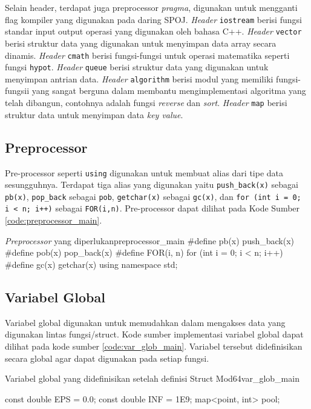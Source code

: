 Selain header, terdapat juga preprocessor \textit{pragma}, digunakan untuk mengganti flag kompiler yang digunakan pada daring SPOJ.
\textit{Header} \texttt{iostream} berisi fungsi standar input output operasi yang digunakan oleh bahasa C++. \textit{Header} \texttt{vector} berisi struktur data yang digunakan untuk menyimpan data array secara dinamis. \textit{Header} \texttt{cmath} berisi fungsi-fungsi untuk operasi matematika seperti fungsi \texttt{hypot}. \textit{Header} \texttt{queue} berisi struktur data yang digunakan untuk menyimpan antrian data. \textit{Header} \texttt{algorithm} berisi modul yang memiliki fungsi-fungsii yang sangat berguna dalam membantu mengimplementasi algoritma yang telah dibangun, contohnya adalah fungsi \textit{reverse} dan \textit{sort}. \textit{Header} \texttt{map} berisi struktur data untuk menyimpan data \textit{key value}.

\subsection{Preprocessor}
Pre-processor seperti \texttt{using} digunakan untuk membuat alias dari tipe data sesungguhnya. Terdapat tiga alias yang digunakan yaitu \texttt{push_back(x)} sebagai \texttt{pb(x)}, \texttt{pop_back} sebagai \texttt{pob}, \texttt{getchar(x)} sebagai \texttt{gc(x)}, dan \texttt{for (int i = 0; i < n; i++)} sebagai \texttt{FOR(i,n)}. Pre-processor dapat dilihat pada Kode Sumber \ref{code:preprocessor_main}.

\begin{code}[firstnumber=1]{\textit{Preprocessor} yang diperlukan}{preprocessor_main}
#define pb(x) push_back(x)
#define pob(x) pop_back(x)
#define FOR(i, n) for (int i = 0; i < n; i++)
#define gc(x) getchar(x)
using namespace std;
\end{code}

\subsection{Variabel Global}
Variabel global digunakan untuk memudahkan dalam mengakses data yang digunakan lintas fungsi/struct. Kode sumber implementasi variabel global dapat dilihat pada kode sumber \ref{code:var_glob_main}. Variabel tersebut didefinisikan secara global agar dapat digunakan pada setiap fungsi.

\begin{code}[firstnumber=1]{Variabel global yang didefinisikan setelah definisi Struct Mod64}{var_glob_main}
	
const double EPS = 0.0;
const double INF = 1E9;
map<point, int> pool;
\end{code}

